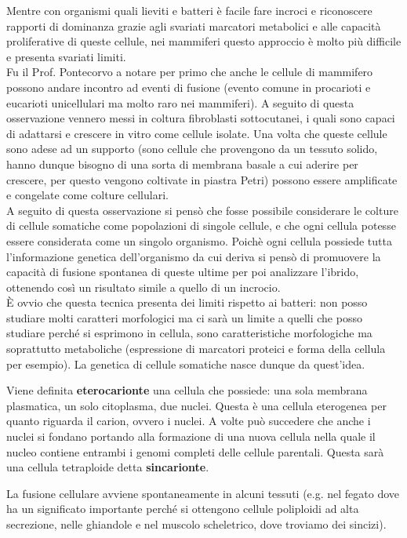 \documentclass[11pt]{book}
\begin{document}
Mentre con organismi quali lieviti e batteri è facile fare incroci e riconoscere rapporti di dominanza grazie agli svariati marcatori metabolici e alle capacità proliferative di queste cellule, nei mammiferi questo approccio è molto più difficile e presenta svariati limiti.\\
Fu il Prof. Pontecorvo a notare per primo che anche le cellule di mammifero possono andare incontro ad eventi di fusione (evento comune in procarioti e eucarioti unicellulari ma molto raro nei mammiferi). A seguito di questa osservazione vennero messi in coltura fibroblasti sottocutanei, i quali sono capaci di adattarsi e crescere in vitro come cellule isolate. Una volta che queste cellule sono adese ad un supporto (sono cellule che provengono da un tessuto solido, hanno dunque bisogno di una sorta di membrana basale a cui aderire per crescere, per questo vengono coltivate in piastra Petri) possono essere amplificate e congelate come colture cellulari.\\
A seguito di questa osservazione si pensò che fosse possibile considerare le colture di cellule somatiche come popolazioni di singole cellule, e che ogni cellula potesse essere considerata come un singolo organismo. Poichè ogni cellula possiede tutta l’informazione genetica dell’organismo da cui deriva si pensò di promuovere la capacità di fusione spontanea di queste ultime per poi analizzare l’ibrido, ottenendo così un risultato simile a quello di un incrocio.\\
È ovvio che questa tecnica presenta dei limiti rispetto ai batteri: non posso studiare molti caratteri morfologici ma ci sarà un limite a quelli che posso studiare perché si esprimono in cellula, sono caratteristiche morfologiche ma soprattutto metaboliche (espressione di marcatori proteici e forma della cellula per esempio). La genetica di cellule somatiche nasce dunque da quest’idea.

Viene definita \textbf{eterocarionte} una cellula che possiede: una sola membrana plasmatica, un solo citoplasma, due nuclei. Questa è una cellula eterogenea per quanto riguarda il carion, ovvero i nuclei.
A volte può succedere che anche i nuclei si fondano portando alla formazione di una nuova cellula nella quale il nucleo contiene entrambi i genomi completi delle cellule parentali. Questa sarà una cellula tetraploide detta \textbf{sincarionte}.

La fusione cellulare avviene spontaneamente in alcuni tessuti (e.g. nel fegato dove ha un significato importante perché si ottengono cellule poliploidi ad alta secrezione, nelle ghiandole e nel muscolo scheletrico, dove troviamo dei sincizi).
\end{document}
